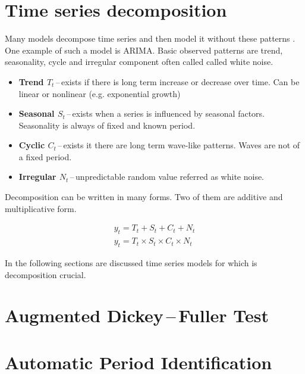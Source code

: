     \section{Time series decomposition}
    Many models decompose time series and then model it without these patterns
    \cite{otexts}. One example of such a model is ARIMA.
    Basic observed patterns are trend, seasonality, cycle and irregular
    component often called called white noise. 
    
    \begin{itemize}
        \item \textbf{Trend $ T_{t} $}\,--\,exists if there is long term increase or decrease over
            time. Can be linear or nonlinear (e.g. exponential growth)
        \item \textbf{Seasonal $ S_{t} $}\,--\,exists when a series is influenced by seasonal factors.
            Seasonality is always of fixed and known period.
        \item \textbf{Cyclic $ C_{t} $}\,--\,exists it there are long term wave-like patterns.
            Waves are not of a fixed period.
        \item \textbf{Irregular $ N_{t} $}\,--\,unpredictable random value referred as white
            noise. 
    \end{itemize}

    Decomposition can be written in many forms. Two of them are additive and
    multiplicative form.

    \begin{eqnarray}
        y_{t} = T_{t} + S_{t} + C_{t} + N_{t} \\
        y_{t} = T_{t} \times S_{t} \times C_{t} \times N_{t} 
    \end{eqnarray}

    In the following sections are discussed time series models for which is decomposition
    crucial.

    \section{Augmented Dickey\,--\,Fuller Test}

    \section{Automatic Period Identification}

